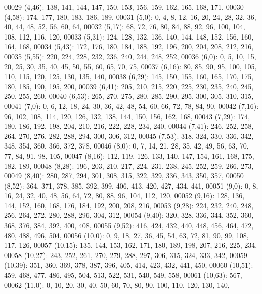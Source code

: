 \begin{DoxyCode}
00029       (4,46): 138, 141, 144, 147, 150, 153, 156, 159, 162, 165, 168, 171,
00030       (4,58): 174, 177, 180, 183, 186, 189,
00031       (5,0): 0, 4, 8, 12, 16, 20, 24, 28, 32, 36, 40, 44, 48, 52, 56, 60, 64,
00032       (5,17): 68, 72, 76, 80, 84, 88, 92, 96, 100, 104, 108, 112, 116, 120,
00033       (5,31): 124, 128, 132, 136, 140, 144, 148, 152, 156, 160, 164, 168,
00034       (5,43): 172, 176, 180, 184, 188, 192, 196, 200, 204, 208, 212, 216,
00035       (5,55): 220, 224, 228, 232, 236, 240, 244, 248, 252,
00036       (6,0): 0, 5, 10, 15, 20, 25, 30, 35, 40, 45, 50, 55, 60, 65, 70, 75,
00037       (6,16): 80, 85, 90, 95, 100, 105, 110, 115, 120, 125, 130, 135, 140,
00038       (6,29): 145, 150, 155, 160, 165, 170, 175, 180, 185, 190, 195, 200,
00039       (6,41): 205, 210, 215, 220, 225, 230, 235, 240, 245, 250, 255, 260,
00040       (6,53): 265, 270, 275, 280, 285, 290, 295, 300, 305, 310, 315,
00041       (7,0): 0, 6, 12, 18, 24, 30, 36, 42, 48, 54, 60, 66, 72, 78, 84, 90,
00042       (7,16): 96, 102, 108, 114, 120, 126, 132, 138, 144, 150, 156, 162, 168,
00043       (7,29): 174, 180, 186, 192, 198, 204, 210, 216, 222, 228, 234, 240,
00044       (7,41): 246, 252, 258, 264, 270, 276, 282, 288, 294, 300, 306, 312,
00045       (7,53): 318, 324, 330, 336, 342, 348, 354, 360, 366, 372, 378,
00046       (8,0): 0, 7, 14, 21, 28, 35, 42, 49, 56, 63, 70, 77, 84, 91, 98, 105,
00047       (8,16): 112, 119, 126, 133, 140, 147, 154, 161, 168, 175, 182, 189,
00048       (8,28): 196, 203, 210, 217, 224, 231, 238, 245, 252, 259, 266, 273,
00049       (8,40): 280, 287, 294, 301, 308, 315, 322, 329, 336, 343, 350, 357,
00050       (8,52): 364, 371, 378, 385, 392, 399, 406, 413, 420, 427, 434, 441,
00051       (9,0): 0, 8, 16, 24, 32, 40, 48, 56, 64, 72, 80, 88, 96, 104, 112, 120,
00052       (9,16): 128, 136, 144, 152, 160, 168, 176, 184, 192, 200, 208, 216,
00053       (9,28): 224, 232, 240, 248, 256, 264, 272, 280, 288, 296, 304, 312,
00054       (9,40): 320, 328, 336, 344, 352, 360, 368, 376, 384, 392, 400, 408,
00055       (9,52): 416, 424, 432, 440, 448, 456, 464, 472, 480, 488, 496, 504,
00056       (10,0): 0, 9, 18, 27, 36, 45, 54, 63, 72, 81, 90, 99, 108, 117, 126,
00057       (10,15): 135, 144, 153, 162, 171, 180, 189, 198, 207, 216, 225, 234,
00058       (10,27): 243, 252, 261, 270, 279, 288, 297, 306, 315, 324, 333, 342,
00059       (10,39): 351, 360, 369, 378, 387, 396, 405, 414, 423, 432, 441, 450,
00060       (10,51): 459, 468, 477, 486, 495, 504, 513, 522, 531, 540, 549, 558,
00061       (10,63): 567,
00062       (11,0): 0, 10, 20, 30, 40, 50, 60, 70, 80, 90, 100, 110, 120, 130, 140,

\end{DoxyCode}
